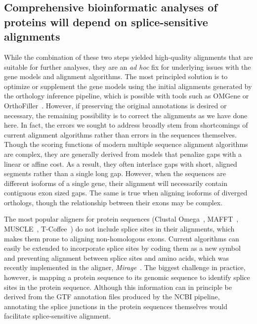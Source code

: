 \subsection{Comprehensive bioinformatic analyses of proteins will depend on splice-sensitive alignments}
While the combination of these two steps yielded high-quality alignments that are suitable for further analyses, they are an \textit{ad hoc} fix for underlying issues with the gene models and alignment algorithms. The most principled solution is to optimize or supplement the gene models using the initial alignments generated by the orthology inference pipeline, which is possible with tools such as OMGene or OrthoFiller~\cite{Dunne2018, Dunne2017}. However, if preserving the original annotations is desired or necessary, the remaining possibility is to correct the alignments as we have done here. In fact, the errors we sought to address broadly stem from shortcomings of current alignment algorithms rather than errors in the sequences themselves. Though the scoring functions of modern multiple sequence alignment algorithms are complex, they are generally derived from models that penalize gaps with a linear or affine cost. As a result, they often interlace gaps with short, aligned segments rather than a single long gap. However, when the sequences are different isoforms of a single gene, their alignment will necessarily contain contiguous exon sized gaps. The same is true when aligning isoforms of diverged orthologs, though the relationship between their exons may be complex.

The most popular aligners for protein sequences (Clustal Omega~\cite{Sievers2017}, MAFFT~\cite{Katoh2013}, MUSCLE~\cite{Edgar2004}, T-Coffee~\cite{Notredame2000}) do not include splice sites in their alignments, which makes them prone to aligning non-homologous exons. Current algorithms can easily be extended to incorporate splice sites by coding them as a new symbol and preventing alignment between splice sites and amino acids, which was recently implemented in the aligner, \textit{Mirage}~\cite{Nord2018}. The biggest challenge in practice, however, is mapping a protein sequence to its genomic sequence to identify splice sites in the protein sequence. Although this information can in principle be derived from the GTF annotation files produced by the NCBI pipeline, annotating the splice junctions in the protein sequences themselves would facilitate splice-sensitive alignment.

